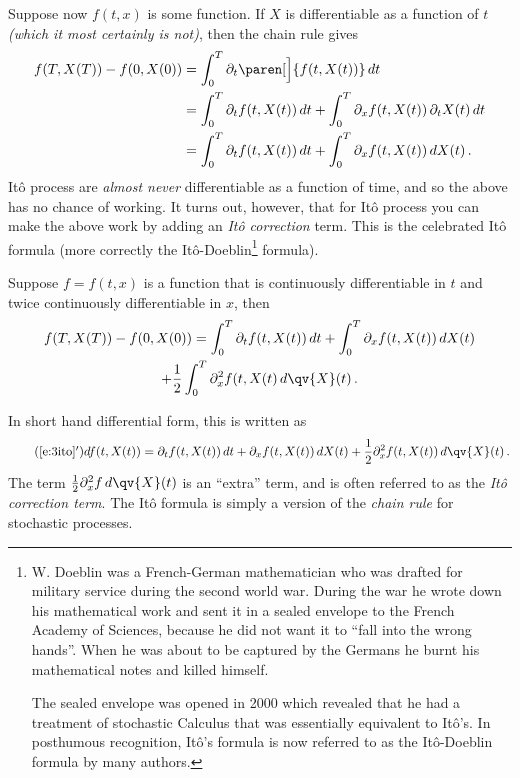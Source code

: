 Suppose now $f(t, x)$ is some function.
If $X$ is differentiable as a function of $t$ \emph{(which it most certainly is not)}, then the chain rule gives
\begin{align*}
  f(T, X(T)) - f(0, X(0))
    &= \int_0^T \partial_t \paren[\Big]{ f(t, X(t)) } \, dt
  \\
    &= \int_0^T \partial_t f( t, X(t)) \, dt
      + \int_0^T \partial_x f( t, X(t) ) \, \partial_t X(t) \, dt
  \\
    &= \int_0^T \partial_t f( t, X(t) ) \, dt
      + \int_0^T \partial_x f(t, X(t) ) \, dX(t)\,.
\end{align*}
It\^o process are \emph{almost never} differentiable as a function of time, and so the above has no chance of working.
It turns out, however, that for It\^o process you can make the above work by adding an \emph{It\^o correction} term.
This is the celebrated It\^o formula (more correctly the It\^o-Doeblin\footnote{%
  W. Doeblin was a French-German mathematician who was drafted for military service during the second world war.
  During the war he wrote down his mathematical work and sent it in a sealed envelope to the French Academy of Sciences, because he did not want it to ``fall into the wrong hands''.
  When he was about to be captured by the Germans he burnt his mathematical notes and killed himself.

  The sealed envelope was opened in 2000 which revealed that he had a treatment of stochastic Calculus that was essentially equivalent to It\^o's.
  In posthumous recognition, It\^o's formula is now referred to as the It\^o-Doeblin formula by many authors.
}
formula).

\begin{theorem}[It\^o formula]
  Suppose $f = f(t, x)$ is a function that is continuously differentiable in $t$ and twice continuously differentiable in $x$, then
  \begin{multline}\label{e:3ito}
    f(T, X(T)) - f(0, X(0))
      = \int_0^T \partial_t f( t, X(t) ) \, dt
	+ \int_0^T \partial_x f(t, X(t) ) \, dX(t)
    \\
	+ \frac{1}{2} \int_0^T \partial_x^2 f(t, X(t) \, d\qv{X}(t)\,.
  \end{multline}
\end{theorem}

\begin{remark}
  In short hand differential form, this is written as
  \begin{equation}\label{e:3itoD}
    \tag{\ref{e:3ito}$'$}
    df(t, X(t)) = \partial_t f(t, X(t)) \, dt + \partial_x f(t, X(t)) \, dX(t)
      + \frac{1}{2} \partial_x^2 f(t, X(t)) \, d\qv{X}(t)\,.
  \end{equation}
  The term $\frac{1}{2} \partial_x^2 f \, d\qv{X}(t)$ is an ``extra'' term, and is often referred to as the \emph{It\^o correction term}.
  The It\^o formula is simply a version of the \emph{chain rule} for stochastic processes.
\end{remark}

